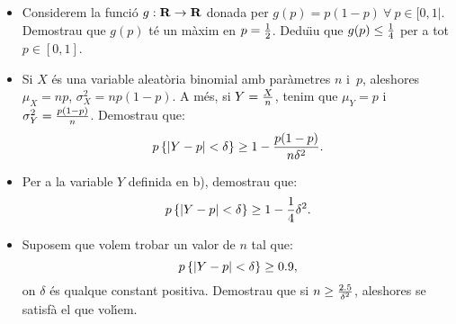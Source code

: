 \begin{probres}
{\begin{itemize}
\item[a)]{Considerem la funci\'o $g : {\bf R} \to {\bf R}$ donada per $g(p)=p(1-p) \ \forall  \> p \in [0,1|$. Demostrau que $g(p)$ t\'e un
m\`axim en $p={1\over 2}$. Dedu\"{\i}u que $g(p)\leq {1\over 4}$ per a tot $p\in
[0,1]$.}
\item[b)]{Si $X$ \'es una variable aleat\`oria binomial amb par\`ametres $n$ i~$p$,
aleshores \hbox{$\mu_X =n p$}, \hbox{$\sigma_X^2 =n p (1-p)$.} A m\'es, si
$Y={X\over n}$, tenim que \hbox{$\mu_Y =p$} i \hbox{$\sigma_Y^2 ={p(1-p)\over
n}$.} Demostrau que: $$p\left\{\vert Y-p\vert <\delta \right\}\geq 1-{p (1-p)\over
n\delta^2}.$$}
\item[c)]Per a la variable $Y$ definida en b), demostrau que:
$$p\left\{\vert Y-p\vert <\delta \right\}\geq 1-{1\over 4}\delta^2 .$$
\item[d)]{Suposem que volem trobar un valor de $n$ tal que:
$$p\left\{\vert Y-p\vert <\delta \right\}\geq 0.9,$$on $\delta$ \'es qualque
constant positiva. Demostrau que si $n\geq {2.5\over \delta^2}$, aleshores
se satisf\`a el que vol\'{\i}em.}
\end{itemize}}
\end{probres}

